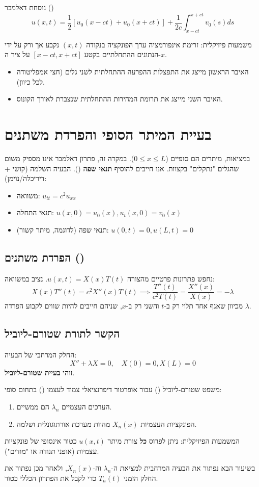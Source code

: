 \begin{resultbox}{נוסחת דאלמבר ()}
$$ u(x,t) = \frac{1}{2}\left[ u_0(x-ct) + u_0(x+ct) \right] + \frac{1}{2c} \int_{x-ct}^{x+ct} v_0(s) ds $$
\end{resultbox}

\begin{theorembox}{משמעות פיזיקלית: זרימת אינפורמציה}
ערך הפונקציה בנקודה $(x,t)$ נקבע אך ורק על ידי הנתונים ההתחלתיים בקטע $[x-ct, x+ct]$ על ציר ה-$x$.
\begin{itemize}
    \item האיבר הראשון מייצג את התפצלות ההפרעה ההתחלתית לשני גלים (חצי אמפליטודה לכל כיוון).
    \item האיבר השני מייצג את תרומת המהירות ההתחלתית שנצברת לאורך הקונוס.
\end{itemize}
\end{theorembox}

\section{בעיית המיתר הסופי והפרדת משתנים}

במציאות, מיתרים הם סופיים ($0 \le x \le L$). במקרה זה, פתרון דאלמבר אינו מספיק משום שהגלים "נתקלים" בקצוות. אנו חייבים להוסיף \textbf{תנאי שפה} ().
הבעיה השלמה (קושי + דיריכלה/נוימן):
\begin{itemize}
    \item משוואה: $u_{tt} = c^2 u_{xx}$
    \item תנאי התחלה: $u(x,0)=u_0(x), u_t(x,0)=v_0(x)$
    \item תנאי שפה (לדוגמה, מיתר קשור): $u(0,t)=0, u(L,t)=0$
\end{itemize}

\subsection{הפרדת משתנים ()}
נחפש פתרונות פרטיים מהצורה $u(x,t) = X(x)T(t)$.
נציב במשוואה:
$$ X(x)T''(t) = c^2 X''(x)T(t) \implies \frac{T''(t)}{c^2 T(t)} = \frac{X''(x)}{X(x)} = -\lambda $$
מכיוון שאגף אחד תלוי רק ב-$t$ והשני רק ב-$x$, שניהם חייבים להיות שווים לקבוע הפרדה $\lambda$.

\subsection{הקשר לתורת שטורם-ליוביל}
החלק המרחבי של הבעיה:
$$ X'' + \lambda X = 0, \quad X(0)=0, X(L)=0 $$
זוהי \textbf{בעיית שטורם-ליוביל}.
\begin{theorembox}{משפט שטורם-ליוביל ()}
עבור אופרטור דיפרנציאלי צמוד לעצמו () בתחום סופי:
\begin{enumerate}
    \item הערכים העצמיים $\lambda_n$ הם ממשיים.
    \item הפונקציות העצמיות $X_n(x)$ מהוות מערכת אורתוגונלית ושלמה.
\end{enumerate}
המשמעות הפיזיקלית: ניתן לפרוס \textbf{כל} צורת מיתר $u(x,t)$ כטור אינסופי של פונקציות עצמיות (אופני תנודה או "מודים").
\end{theorembox}

בשיעור הבא נפתור את הבעיה המרחבית למציאת ה-$\lambda_n$ וה-$X_n(x)$, ולאחר מכן נפתור את החלק הזמני $T_n(t)$ כדי לקבל את הפתרון הכללי כטור.

